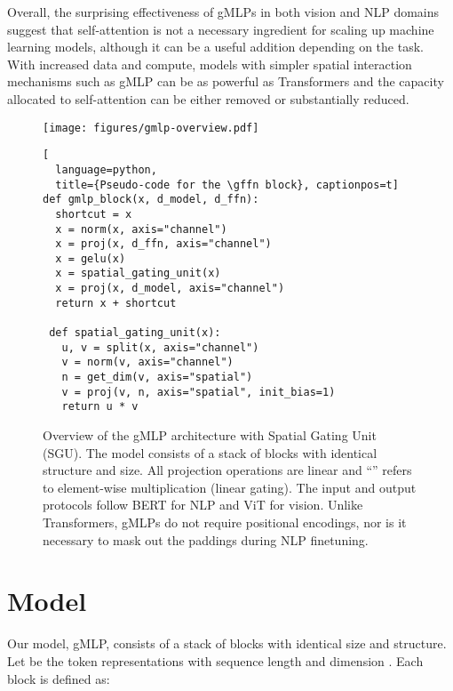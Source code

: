 \documentclass{article}
\newcommand{\gffn}{gMLP\xspace}
\begin{document}
Overall,
the surprising effectiveness of \gffn{s} in both vision and NLP domains suggest that self-attention is not a necessary ingredient for scaling up machine learning models,
although it can be a useful addition depending on the task.
With increased data and compute,
models with simpler spatial interaction mechanisms such as gMLP can be as powerful as Transformers and
the capacity allocated to self-attention can be either removed or substantially reduced.

\begin{figure}[t]
    \centering
    \begin{minipage}{0.5\linewidth}
        \texttt{[image: figures/gmlp-overview.pdf]}
    \end{minipage}
    \begin{minipage}{0.475\linewidth}
    \begin{lstlisting}[
  language=python,
  title={Pseudo-code for the \gffn block}, captionpos=t]
def gmlp_block(x, d_model, d_ffn):
  shortcut = x
  x = norm(x, axis="channel")
  x = proj(x, d_ffn, axis="channel")
  x = gelu(x)
  x = spatial_gating_unit(x)
  x = proj(x, d_model, axis="channel")
  return x + shortcut
  
 def spatial_gating_unit(x):
   u, v = split(x, axis="channel")
   v = norm(v, axis="channel")
   n = get_dim(v, axis="spatial")
   v = proj(v, n, axis="spatial", init_bias=1)
   return u * v
\end{lstlisting}
    \end{minipage}
    \caption{Overview of the \gffn architecture with Spatial Gating Unit (SGU). The model consists of a stack of  blocks with identical structure and size. All projection operations are linear and ``'' refers to element-wise multiplication (linear gating). The input and output protocols follow BERT for NLP and ViT for vision. Unlike Transformers, \gffn{s} do not require positional encodings, nor is it necessary to mask out the paddings during NLP finetuning.}
    \label{fig:architecture}
\end{figure}

\section{Model}

Our model, \gffn, consists of a stack of  blocks with identical size and structure.
Let  be the token representations with sequence length  and dimension .
Each block is defined as:
\end{document}

